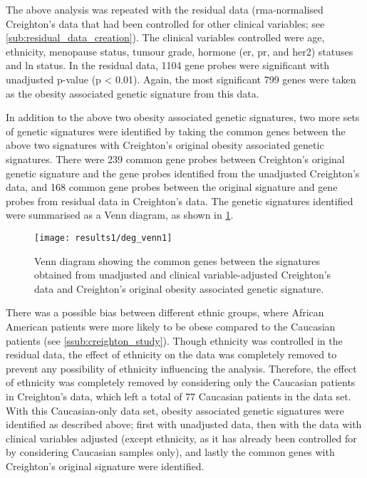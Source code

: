 The above analysis was repeated with the residual data (\gls{rma}-normalised Creighton's data that had been controlled for other clinical variables; see \cref{sub:residual_data_creation}).
The clinical variables controlled were age, ethnicity, menopause status, tumour grade, hormone (\gls{er}, \gls{pr}, and \gls{her2}) statuses  and \gls{ln} status.
In the residual data, 1104 gene probes were significant with unadjusted p-value (p \textless{} 0.01).
Again, the most significant 799 genes were taken as the obesity associated genetic signature from this data.

In addition to the above two obesity associated genetic signatures, two more sets of genetic signatures were identified by taking the common genes between the above two signatures with Creighton's original obesity associated genetic signatures.
There were 239 common gene probes between Creighton's original genetic signature and the gene probes identified from the unadjusted Creighton's data, and 168 common gene probes between the original signature and gene probes from residual data in Creighton's data.
The genetic signatures identified were summarised as a Venn diagram, as shown in \cref{fig:venn1}.
\\

\begin{figure}[htp!]
	\centering
	\texttt{[image: results1/deg\_venn1]}
	\caption[Veen diagram of the \glspl{deg} identified from Creighton's data (all samples)]{Venn diagram showing the common genes between the signatures obtained from unadjusted and clinical variable-adjusted Creighton's data and Creighton's original obesity associated genetic signature.}
	\label{fig:venn1}
\end{figure}

\noindent
There was a possible bias between different ethnic groups, where African American patients were more likely to be obese compared to the Caucasian patients (see \cref{ssub:creighton_study}).
Though ethnicity was controlled in the residual data, the effect of ethnicity on the data was completely removed to prevent any possibility of ethnicity influencing the analysis.
Therefore, the effect of ethnicity was completely removed by considering only the Caucasian patients in Creighton's data, which left a total of 77 Caucasian patients in the data set.
With this Caucasian-only data set, obesity associated genetic signatures were identified as described above; first with unadjusted data, then with the data with clinical variables adjusted (except ethnicity, as it has already been controlled for by considering Caucasian samples only), and lastly the common genes with Creighton's original signature were identified.

